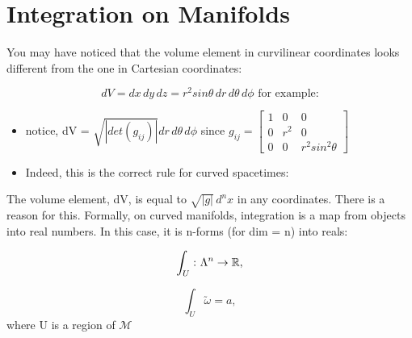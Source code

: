 \documentclass[10pt]{article}
\begin{document}
	\section{Integration on Manifolds}
	You may have noticed that the volume element in curvilinear coordinates looks different from the one in Cartesian
	coordinates:

	$$dV = dx\,dy\,dz = r^{2}sin\theta \,dr\,d\theta \, d\phi \text{ for example:}$$
	\begin{itemize}[label=*]
	\item notice, dV = $\sqrt{|det(g_{ij})|}dr\,d\theta \,d\phi$ since \(g_{ij} = \begin{bmatrix}
    											1 & 0     & 0 \\
    											0 & r^{2} & 0 \\
											0 & 0     & r^{2}sin^{2}\theta
  											\end{bmatrix}\)
	\item Indeed, this is the correct rule for curved spacetimes:
	\end{itemize}
	The volume element, dV, is equal to $\sqrt{|g|}\,d^{n}x$ in any coordinates. There is a reason for this. 
	Formally, on curved manifolds, integration is a map from objects into real numbers. In this case, it is 
	n-forms (for dim = n)  into reals:

	$$\int_{U} \huge{\colon \Lambda^{n} \rightarrow \mathbb{R}},$$

	$$\int_{U} \utilde{\omega} = a, $$
	where U is a region of $\mathcal{M}$
\end{document}
